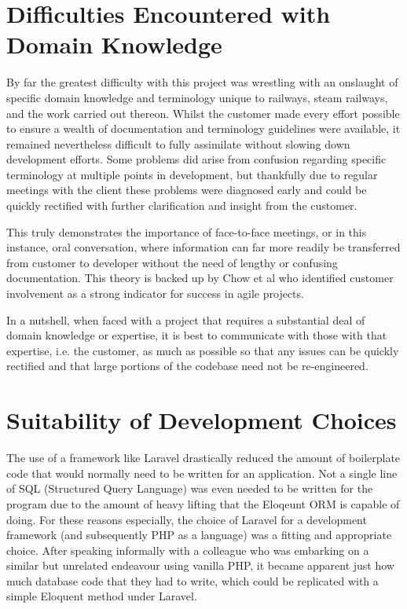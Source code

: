 \section{Difficulties Encountered with Domain Knowledge}
By far the greatest difficulty with this project was wrestling with an onslaught of specific domain knowledge and terminology unique to railways, steam railways, and the work carried out thereon. Whilst the customer made every effort possible to ensure a wealth of documentation and terminology guidelines were available, it remained nevertheless difficult to fully assimilate without slowing down development efforts. Some problems did arise from confusion regarding specific terminology at multiple points in development, but thankfully due to regular meetings with the client these problems were diagnosed early and could be quickly rectified with further clarification and insight from the customer. 

This truly demonstrates the importance of face-to-face meetings, or in this instance, oral conversation, where information can far more readily be transferred from customer to developer without the need of lengthy or confusing documentation. This theory is backed up by Chow et al who identified customer involvement as a strong indicator for success in agile projects. \cite{CHOW2008961}

In a nutshell, when faced with a project that requires a substantial deal of domain knowledge or expertise, it is best to communicate with those with that expertise, i.e. the customer, as much as possible so that any issues can be quickly rectified and that large portions of the codebase need not be re-engineered.

\section{Suitability of Development Choices}
The use of a framework like Laravel drastically reduced the amount of boilerplate code that would normally need to be written for an application. Not a single line of SQL (Structured Query Language) was even needed to be written for the program due to the amount of heavy lifting that the Eloqeunt ORM is capable of doing. For these reasons especially, the choice of Laravel for a development framework (and subsequently PHP as a language) was a fitting and appropriate choice. After speaking informally with a colleague who was embarking on a similar but unrelated endeavour using vanilla PHP, it became apparent just how much database code that they had to write, which could be replicated with a simple Eloquent method under Laravel.

